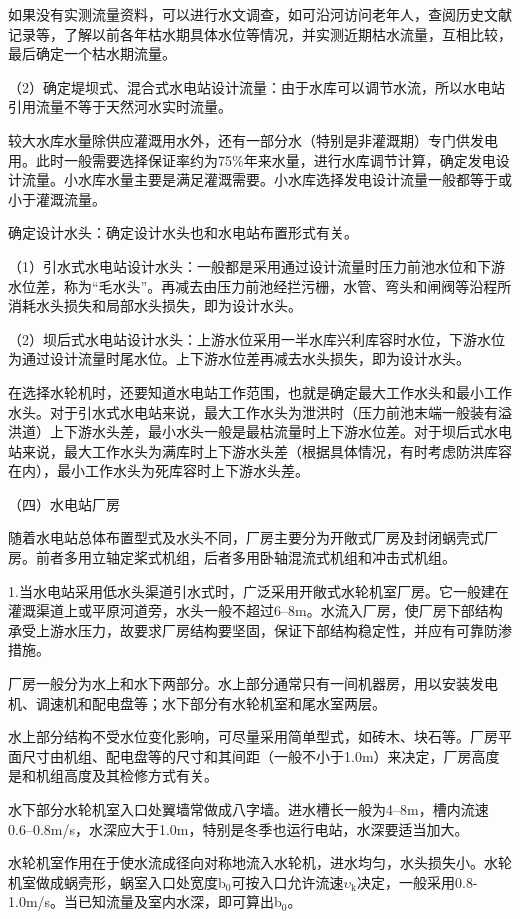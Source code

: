 \documentclass{ctexbook}
\begin{document}
如果没有实测流量资料，可以进行水文调查，如可沿河访问老年人，查阅历史文献记录等，了解以前各年枯水期具体水位等情况，并实测近期枯水流量，互相比较，最后确定一个枯水期流量。

（2）确定堤坝式、混合式水电站设计流量：由于水库可以调节水流，所以水电站引用流量不等于天然河水实时流量。

较大水库水量除供应灌溉用水外，还有一部分水（特别是非灌溉期）专门供发电用。此时一般需要选择保证率约为75\%年来水量，进行水库调节计算，确定发电设计流量。小水库水量主要是满足灌溉需要。小水库选择发电设计流量一般都等于或小于灌溉流量。

确定设计水头：确定设计水头也和水电站布置形式有关。

（1）引水式水电站设计水头：一般都是采用通过设计流量时压力前池水位和下游水位差，称为“毛水头”。再减去由压力前池经拦污栅，水管、弯头和闸阀等沿程所消耗水头损失和局部水头损失，即为设计水头。

（2）坝后式水电站设计水头：上游水位采用一半水库兴利库容时水位，下游水位为通过设计流量时尾水位。上下游水位差再减去水头损失，即为设计水头。

在选择水轮机时，还要知道水电站工作范围，也就是确定最大工作水头和最小工作水头。对于引水式水电站来说，最大工作水头为泄洪时（压力前池末端一般装有溢洪道）上下游水头差，最小水头一般是最枯流量时上下游水位差。对于坝后式水电站来说，最大工作水头为满库时上下游水头差（根据具体情况，有时考虑防洪库容在内），最小工作水头为死库容时上下游水头差。

（四）水电站厂房

随着水电站总体布置型式及水头不同，厂房主要分为开敞式厂房及封闭蜗壳式厂房。前者多用立轴定桨式机组，后者多用卧轴混流式机组和冲击式机组。

1.当水电站采用低水头渠道引水式时，广泛采用开敞式水轮机室厂房。它一般建在灌溉渠道上或平原河道旁，水头一般不超过6--8m。水流入厂房，使厂房下部结构承受上游水压力，故要求厂房结构要坚固，保证下部结构稳定性，并应有可靠防渗措施。

厂房一般分为水上和水下两部分。水上部分通常只有一间机器房，用以安装发电机、调速机和配电盘等；水下部分有水轮机室和尾水室两层。

水上部分结构不受水位变化影响，可尽量采用简单型式，如砖木、块石等。厂房平面尺寸由机组、配电盘等的尺寸和其间距（一般不小于1.0m）来决定，厂房高度是和机组高度及其检修方式有关。

水下部分水轮机室入口处翼墙常做成八字墙。进水槽长一般为4--8m，槽内流速0.6--0.8m/s，水深应大于1.0m，特别是冬季也运行电站，水深要适当加大。

水轮机室作用在于使水流成径向对称地流入水轮机，进水均匀，水头损失小。水轮机室做成蜗壳形，蜗室入口处宽度b$_0$可按入口允许流速$\upsilon_{\text{k}}$决定，一般采用0.8-1.0m/s。当已知流量及室内水深，即可算出b$_0$。
\end{document}
